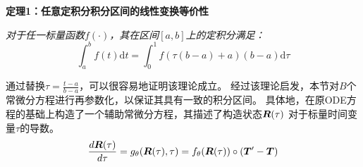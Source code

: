 \textbf{定理1：任意定积分积分区间的线性变换等价性}

\textit{对于任一标量函数$f(\cdot)$，其在区间$[a, b]$上的定积分满足：}
\begin{equation}
\int_{a}^bf(t) \text{d}t=\int_{0}^1f(\tau(b-a)+a) (b-a)\text{d}\tau
\end{equation}

通过替换$\tau = \frac{t-a}{b-a}$，可以很容易地证明该理论成立。
经过该理论启发，本节对$B$个常微分方程进行再参数化，以保证其具有一致的积分区间。
具体地，在原ODE方程的基础上构造了一个辅助常微分方程，其描述了构造状态$\boldsymbol{R}(\tau)$ 对于标量时间变量$\tau$的导数。
\begin{equation}
    \frac{d\boldsymbol R(\tau)}{d\tau}=g_{\theta}(\boldsymbol R(\tau), \tau)=f_\theta(\boldsymbol R(\tau))\circ (\boldsymbol{T}'-\boldsymbol{T})
\label{equ:construct_ode}
\end{equation}

